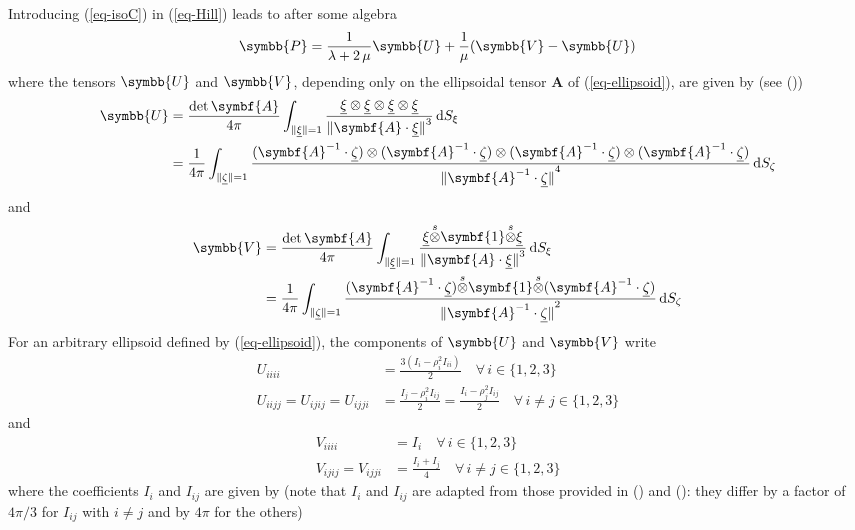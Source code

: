\documentclass[
  a4paper,
  numbers=noendperiod,
  DIV=12]{scrreprt}
\newcommand{\uu}[1]{{\symbf{{#1}}}}
\newcommand{\uuuu}[1]{{\symbb{{#1}}}}
\newcommand{\uv}[1]{{\underline{{#1}}}}
\newcommand{\sotimes}{{\stackrel{s}{\otimes}}}
\newcommand{\norm}[1]{{\lVert{{#1}}\rVert}}
\newcommand{\ud}{{\,\mathrm{d}}}
\begin{document}
Introducing (\ref{eq-isoC}) in (\ref{eq-Hill}) leads to after some
algebra \[
\uuuu{P}=
\frac{1}{\lambda+2\,\mu}
\uuuu{U}
+\frac{1}{\mu}(\uuuu{V}-\uuuu{U})
\] where the tensors \(\uuuu{U}\) and \(\uuuu{V}\), depending only on
the ellipsoidal tensor \(\uu{A}\) of (\ref{eq-ellipsoid}), are given by
(see ())
\[\begin{aligned}
\uuuu{U} &= \frac{\det{\uu{A}}}{4\pi}
\int_{\norm{\uv{\xi}}=1}
\frac{\uv{\xi}\otimes\uv{\xi}\otimes\uv{\xi}\otimes\uv{\xi}}
{\norm{\uu{A}\cdot\uv{\xi}}^3}\ud S_{\xi}\\
&=
\frac{1}{4\pi}
\int_{\norm{\uv{\zeta}}=1}
\frac{%
(\uu{A}^{-1}\cdot\uv{\zeta})
\otimes
(\uu{A}^{-1}\cdot\uv{\zeta})
\otimes
(\uu{A}^{-1}\cdot\uv{\zeta})
\otimes
(\uu{A}^{-1}\cdot\uv{\zeta})
}{\norm{\uu{A}^{-1}\cdot\uv{\zeta}}^4}
\ud S_{\zeta}
\end{aligned}\] and \[\begin{aligned}
\uuuu{V} &= \frac{\det{\uu{A}}}{4\pi}
\int_{\norm{\uv{\xi}}=1}
\frac{\uv{\xi}\sotimes\uu{1}\sotimes\uv{\xi}}
{\norm{\uu{A}\cdot\uv{\xi}}^3}\ud S_{\xi}\\
&=
\frac{1}{4\pi}
\int_{\norm{\uv{\zeta}}=1}
\frac{%
(\uu{A}^{-1}\cdot\uv{\zeta})
\sotimes
\uu{1}
\sotimes
(\uu{A}^{-1}\cdot\uv{\zeta})
}{\norm{\uu{A}^{-1}\cdot\uv{\zeta}}^2}
\ud S_{\zeta}
\end{aligned}\] For an arbitrary ellipsoid defined by
(\ref{eq-ellipsoid}), the components of \(\uuuu{U}\) and \(\uuuu{V}\)
write \[\begin{aligned}
U_{iiii}&=\frac{3(I_i-\rho_i^2I_{ii})}{2} 
\quad\forall\, i\in\{1,2,3\}\\
U_{iijj}=U_{ijij}=U_{ijji}&=\frac{I_j-\rho_i^2I_{ij}}{2} 
=\frac{I_i-\rho_j^2I_{ij}}{2}
\quad\forall\, i\neq j\in\{1,2,3\}
\end{aligned}\] and \[\begin{aligned}
V_{iiii}&=I_i\quad\forall\, i\in\{1,2,3\}\\
V_{ijij}=V_{ijji}&=\frac{I_i+I_j}{4}
\quad\forall\, i\neq j\in\{1,2,3\}
\end{aligned}\] where the coefficients \(I_i\) and \(I_{ij}\) are given
by (note that \(I_i\) and \(I_{ij}\) are adapted from those provided in
() and
(): they differ by a factor of
\(4\pi/3\) for \(I_{ij}\) with \(i\neq j\) and by \(4\pi\) for the
others)
\end{document}
